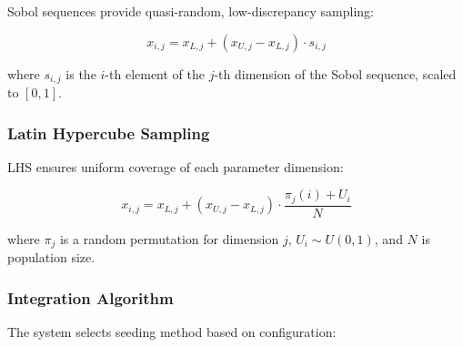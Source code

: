 \documentclass[12pt,a4paper]{article}
\begin{document}
Sobol sequences provide quasi-random, low-discrepancy sampling:

\begin{equation}\label{Eq.sobol_sequence}
x_{i,j} = x_{L,j} + (x_{U,j} - x_{L,j}) \cdot s_{i,j}
\end{equation}

where $s_{i,j}$ is the $i$-th element of the $j$-th dimension of the Sobol sequence, scaled to $[0,1]$.

\subsubsection{Latin Hypercube Sampling}

LHS ensures uniform coverage of each parameter dimension:

\begin{equation}\label{Eq.lhs_sampling}
x_{i,j} = x_{L,j} + (x_{U,j} - x_{L,j}) \cdot \frac{\pi_j(i) + U_i}{N}
\end{equation}

where $\pi_j$ is a random permutation for dimension $j$, $U_i \sim U(0,1)$, and $N$ is population size.

\subsubsection{Integration Algorithm}

The system selects seeding method based on configuration:
\end{document}

